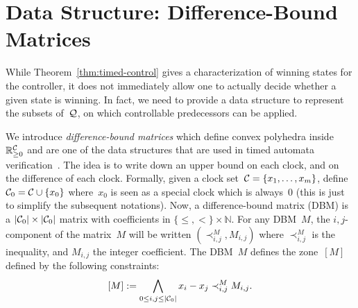 \documentclass{article}
\begin{document}
\section{Data Structure: Difference-Bound Matrices}
While Theorem~\ref{thm:timed-control} gives a characterization of winning states for the
controller, it does not immediately allow one to actually decide whether a given
state is winning. In fact, we need to provide a data structure to represent the
subsets of~$\mathcal{Q}$, on which controllable predecessors can be applied.

We introduce \emph{difference-bound matrices} which define convex polyhedra inside $\mathbb{R}_{\geq 0}^{\mathcal{C}}$
and are one of the data structures that are used in timed automata
verification~\cite{Dil90,BM83}. The idea is to write down an upper bound
on each clock, and on the difference of each clock. Formally, given a clock
set~$\mathcal{C}=\{x_1,\ldots,x_m\}$, define $\mathcal{C}_0 = \mathcal{C} \cup \{x_0\}$
where~$x_0$ is seen as a
special clock which is always~$0$ (this is just to simplify the subsequent notations). Now,
a difference-bound matrix (DBM) is a $|\mathcal{C}_0|\times |\mathcal{C}_0|$ matrix
with coefficients in $\{\leq,<\} \times \mathbb{N}$. For any DBM~$M$, 
the $i,j$-component of the matrix~$M$ will be written
$(\prec^M_{i,j}, M_{i,j})$ where $\prec^M_{i,j}$ is the inequality, and
$M_{i,j}$ the integer coefficient. The DBM~$M$ defines the zone~$[M]$ defined by
the following constraints:
\[
  [M] := \bigwedge_{0\leq i,j \leq |\mathcal{C}_0|} x_i-x_j \prec^M_{i,j} M_{i,j}.
\]
\end{document}
